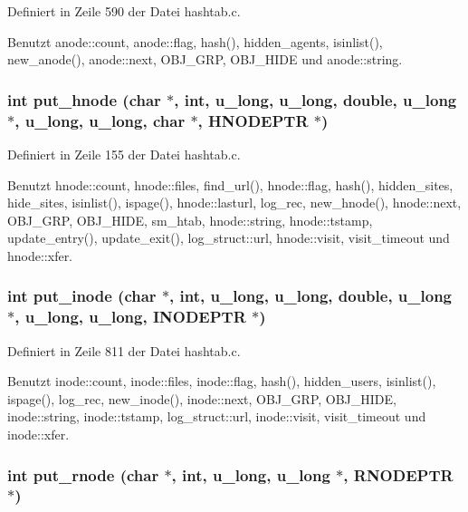 Definiert in Zeile 590 der Datei hashtab.c.

Benutzt anode::count, anode::flag, hash(), hidden\_\-agents, isinlist(), new\_\-anode(), anode::next, OBJ\_\-GRP, OBJ\_\-HIDE und anode::string.
\subsubsection{\setlength{\rightskip}{0pt plus 5cm}int put\_\-hnode (char $\ast$, int, u\_\-long, u\_\-long, double, u\_\-long $\ast$, u\_\-long, u\_\-long, char $\ast$, {\bf HNODEPTR} $\ast$)}\label{hashtab_8h_fe9c0e49a4926c7cba71b7f8db5db8cd}




Definiert in Zeile 155 der Datei hashtab.c.

Benutzt hnode::count, hnode::files, find\_\-url(), hnode::flag, hash(), hidden\_\-sites, hide\_\-sites, isinlist(), ispage(), hnode::lasturl, log\_\-rec, new\_\-hnode(), hnode::next, OBJ\_\-GRP, OBJ\_\-HIDE, sm\_\-htab, hnode::string, hnode::tstamp, update\_\-entry(), update\_\-exit(), log\_\-struct::url, hnode::visit, visit\_\-timeout und hnode::xfer.
\subsubsection{\setlength{\rightskip}{0pt plus 5cm}int put\_\-inode (char $\ast$, int, u\_\-long, u\_\-long, double, u\_\-long $\ast$, u\_\-long, u\_\-long, {\bf INODEPTR} $\ast$)}\label{hashtab_8h_62c7ecc5b3ae3851f5400e30734b8e9e}




Definiert in Zeile 811 der Datei hashtab.c.

Benutzt inode::count, inode::files, inode::flag, hash(), hidden\_\-users, isinlist(), ispage(), log\_\-rec, new\_\-inode(), inode::next, OBJ\_\-GRP, OBJ\_\-HIDE, inode::string, inode::tstamp, log\_\-struct::url, inode::visit, visit\_\-timeout und inode::xfer.
\subsubsection{\setlength{\rightskip}{0pt plus 5cm}int put\_\-rnode (char $\ast$, int, u\_\-long, u\_\-long $\ast$, {\bf RNODEPTR} $\ast$)}\label{hashtab_8h_cba57da4379852348b455ce6e86ef96b}




